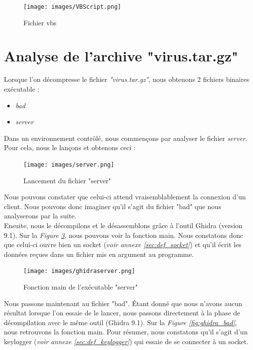 \documentclass[a4paper]{article}
\begin{document}
\begin{figure}[H]
    \centering
    \texttt{[image: images/VBScript.png]}
    \caption{Fichier vbs}
    \label{fig:VBS}
\end{figure}










\newpage
\section{Analyse de l'archive "virus.tar.gz"}

Lorsque l'on décompresse le fichier \emph{"virus.tar.gz"}, nous obtenons 2 fichiers binaires exécutable :
\begin{itemize}
    \item \emph{bad}
    \item \emph{server}
\end{itemize}

Dans un environnement contrôlé, nous commençons par analyser le fichier \emph{server}. Pour cela, nous le lançons et obtenons ceci :

\begin{figure}[H]
    \centering
    \texttt{[image: images/server.png]}
    \caption{Lancement du fichier "server"}
    \label{fig:Fichier_server}
\end{figure}

Nous pouvons constater que celui-ci attend vraisemblablement la connexion d'un client. Nous pouvons donc imaginer qu'il s'agit du fichier "bad" que nous analyserons par la suite.\\
Ensuite, nous le décompilons et le désassemblons grâce à l'outil Ghidra (version 9.1). Sur la \emph{Figure \ref{fig:ghidra_server}}, nous pouvons voir la fonction main. Nous constatons donc que celui-ci ouvre bien un socket (\emph{voir annexe \ref{sec:def_socket}}) et qu'il écrit les données reçues dans un fichier mis en argument au programme.

\begin{figure}[H]
    \centering
    \texttt{[image: images/ghidraserver.png]}
    \caption{Fonction main de l'exécutable "server"}
    \label{fig:ghidra_server}
\end{figure}

Nous passons maintenant au fichier "bad". Étant donné que nous n'avons aucun résultat lorsque l'on essaie de le lancer, nous passons directement à la phase de décompilation avec le même outil (Ghidra 9.1). Sur la \emph{Figure \ref{fig:ghidra_bad}}, nous retrouvons la fonction main. Pour résumer, nous constatons qu'il s'agit d'un keylogger (\emph{voir annexe \ref{sec:def_keylogger}}) qui essaie de se connecter à un socket.
\end{document}
